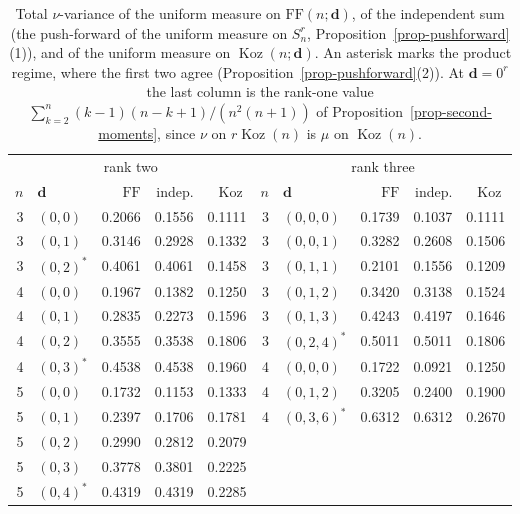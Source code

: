 \documentclass[11pt, a4paper, abstract=yes]{scrartcl}
\theoremstyle{definition}
\theoremstyle{remark}
\theoremstyle{plain}
\newcommand{\vek}[1]{\boldsymbol{#1}}
\theoremstyle{remark}
\theoremstyle{plain}
\newcommand{\Koz}{\operatorname{Koz}}
\newcommand{\FF}{\mathrm{FF}}
\begin{document}
\begin{table}[htbp]\centering\small
\setlength{\tabcolsep}{4.5pt}
\begin{tabular}{@{}rlrrr@{\qquad}rlrrr@{}}
\toprule
\multicolumn{5}{c}{rank two} & \multicolumn{5}{c}{rank three}\\
\cmidrule(r){1-5}\cmidrule(l){6-10}
\(n\) & \(\vek d\) & \(\FF\) & indep. & \(\Koz\) & \(n\) & \(\vek d\) & \(\FF\) & indep. & \(\Koz\)\\
\midrule
3 & \((0,0)\) & 0.2066 & 0.1556 & 0.1111 & 3 & \((0,0,0)\) & 0.1739 & 0.1037 & 0.1111\\
3 & \((0,1)\) & 0.3146 & 0.2928 & 0.1332 & 3 & \((0,0,1)\) & 0.3282 & 0.2608 & 0.1506\\
3 & \((0,2)^*\) & 0.4061 & 0.4061 & 0.1458 & 3 & \((0,1,1)\) & 0.2101 & 0.1556 & 0.1209\\
4 & \((0,0)\) & 0.1967 & 0.1382 & 0.1250 & 3 & \((0,1,2)\) & 0.3420 & 0.3138 & 0.1524\\
4 & \((0,1)\) & 0.2835 & 0.2273 & 0.1596 & 3 & \((0,1,3)\) & 0.4243 & 0.4197 & 0.1646\\
4 & \((0,2)\) & 0.3555 & 0.3538 & 0.1806 & 3 & \((0,2,4)^*\) & 0.5011 & 0.5011 & 0.1806\\
4 & \((0,3)^*\) & 0.4538 & 0.4538 & 0.1960 & 4 & \((0,0,0)\) & 0.1722 & 0.0921 & 0.1250\\
5 & \((0,0)\) & 0.1732 & 0.1153 & 0.1333 & 4 & \((0,1,2)\) & 0.3205 & 0.2400 & 0.1900\\
5 & \((0,1)\) & 0.2397 & 0.1706 & 0.1781 & 4 & \((0,3,6)^*\) & 0.6312 & 0.6312 & 0.2670\\
5 & \((0,2)\) & 0.2990 & 0.2812 & 0.2079 & & & & & \\
5 & \((0,3)\) & 0.3778 & 0.3801 & 0.2225 & & & & & \\
5 & \((0,4)^*\) & 0.4319 & 0.4319 & 0.2285 & & & & & \\
\bottomrule
\end{tabular}
\caption{Total \(\nu\)-variance of the uniform measure on \(\FF(n;\vek d)\), of the
independent sum (the push-forward of the uniform measure on \(S_n^r\),
Proposition~\ref{prop-pushforward}(1)), and of the uniform measure on \(\Koz(n;\vek d)\). An asterisk
marks the product regime, where the first two agree (Proposition~\ref{prop-pushforward}(2)). At
\(\vek d=0^r\) the last column is the rank-one value \(\sum_{k=2}^n(k-1)(n-k+1)/(n^2(n+1))\) of
Proposition~\ref{prop-second-moments}, since \(\nu\) on \(r\Koz(n)\) is \(\mu\) on \(\Koz(n)\).}
\label{tab:rank-r-variance}
\end{table}
\end{document}
